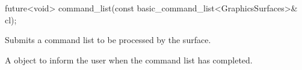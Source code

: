%
\begin{itemdecl}
future<void> command_list(const basic_command_list<GraphicsSurfaces>& cl);
\end{itemdecl}
\begin{itemdescr}
\pnum
\effects Submits a command list to be processed by the surface.

\pnum
\returns A  object to inform the user when the command list has completed.
\end{itemdescr}

